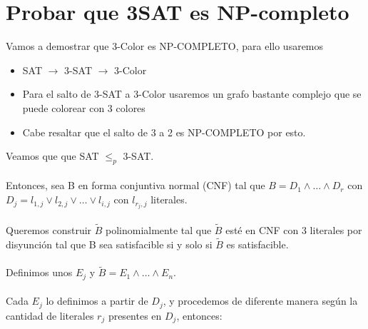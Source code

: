 \documentclass[11pt, a4paper]{article}
\theoremstyle{definition}
\begin{document}
\section{Probar que 3SAT es NP-completo}
Vamos a demostrar que 3-Color es NP-COMPLETO, para ello usaremos
\begin{itemize}
    \item SAT $\rightarrow$ 3-SAT $\rightarrow$ 3-Color
    \item Para el salto de 3-SAT a 3-Color usaremos un grafo bastante complejo que se puede colorear con 3 colores
    \item Cabe resaltar que el salto de 3 a 2 es NP-COMPLETO por esto.
\end{itemize}
Veamos que que SAT $\leq_p$ 3-SAT.\\ \\
Entonces, sea B en forma conjuntiva normal (CNF) tal que $B = D_1 \wedge \ldots \wedge D_r$ con
$D_j = l_{1,j} \vee l_{2,j} \vee \ldots \vee l_{i,j}$ con $l_{r_j,j}$ literales.\\ \\
Queremos construir $\tilde{B}$ polinomialmente tal que $\tilde{B}$ esté en CNF con 3 literales por
disyunción tal que B sea satisfacible si y solo si $\tilde{B}$ es satisfacible.\\ \\
Definimos unos $E_j$ y $\tilde{B} = E_1 \wedge \ldots \wedge E_n$.\\ \\
Cada $E_j$ lo definimos a partir de $D_j$, y procedemos de diferente manera según la
cantidad de literales $r_j$ presentes en $D_j$, entonces:
\end{document}

